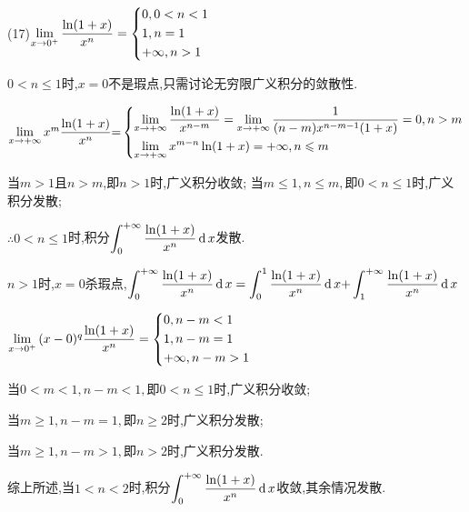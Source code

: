 (17)$\mathop {\lim }\limits_{x \to {0^ +} } \dfrac{{\ln (1 + x)}}{{{x^n}}} = \left\{ \begin{gathered}
  0,0 < n < 1 \hfill \\
  1,n = 1 \hfill \\
   + \infty ,n > 1 \hfill \\
\end{gathered}  \right.$

$0 < n \leqslant 1$时,$x = 0$不是瑕点,只需讨论无穷限广义积分的敛散性.

$\lim\limits_{x \to +\infty} {x^m}\dfrac{{\ln (1 + x)}}{{{x^n}}}{=}\left\{ \begin{gathered}
  \lim\limits_{x \to +\infty} \dfrac{{\ln (1 + x)}}{{{x^{n - m}}}} = \lim\limits_{x \to +\infty} \frac{1}{{(n - m){x^{n - m - 1}}(1 + x)}} = 0,n > m \hfill \\
  \lim\limits_{x \to +\infty} {x^{m - n}}\ln (1 + x) =  + \infty ,n \leqslant m \hfill \\
\end{gathered}  \right.$

当$m > 1$且$n > m$,即$n > 1$时,广义积分收敛;
当$m \leqslant 1,n \leqslant m,$即$0 < n \leqslant 1$时,广义积分发散;

$\therefore 0 < n \leqslant 1$时,积分$\displaystyle\int_0^{ + \infty } {\dfrac{{\ln (1 + x)}}{{{x^n}}}\operatorname{\mathop{}\!\mathrm{d}} x} $发散.

$n > 1$时,$x = 0$杀瑕点,$\displaystyle\int_0^{ + \infty } {\dfrac{{\ln (1 + x)}}{{{x^n}}}\operatorname{\mathop{}\!\mathrm{d}} x}  = \displaystyle\int_0^1 {\dfrac{{\ln (1 + x)}}{{{x^n}}}\operatorname{\mathop{}\!\mathrm{d}} x + } \displaystyle\int_1^{ + \infty } {\dfrac{{\ln (1 + x)}}{{{x^n}}}\operatorname{\mathop{}\!\mathrm{d}} x} $

$\lim\limits_{x \to 0^+} {(x - 0)^q}\dfrac{{\ln (1 + x)}}{{{x^n}}} = \left\{ \begin{gathered}
  0,n - m < 1 \hfill \\
  1,n - m = 1 \hfill \\
   + \infty ,n - m > 1 \hfill \\
\end{gathered}  \right.$

当$0 < m < 1,n - m < 1,$即$0 < n \leqslant 1$时,广义积分收敛;

当$m \geqslant 1,n - m = 1,$即$n \geqslant 2$时,广义积分发散;

当$m \geqslant 1,n - m > 1,$即$n > 2$时,广义积分发散.

综上所述,当$1 < n < 2$时,积分$\displaystyle\int_0^{ + \infty } {\dfrac{{\ln (1 + x)}}{{{x^n}}}\operatorname{\mathop{}\!\mathrm{d}} x} $收敛,其余情况发散.






